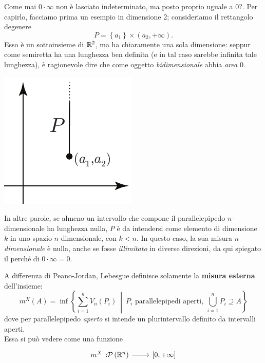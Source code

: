 	\begin{observe}
		Come mai $0\cdot \infty$ non è lasciato indeterminato, ma posto proprio uguale a 0?. Per capirlo, facciamo prima un esempio in dimensione 2; consideriamo il rettangolo degenere
		\begin{equation*}
			P=\left\{a_1\right\}\times\left(a_2,+\infty\right).
		\end{equation*}
		Esso è un sottoinsieme di $\mathbb{R}^2$, ma ha chiaramente una sola dimensione: seppur come semiretta ha una lunghezza ben definita (e in tal caso sarebbe infinita tale lunghezza), è ragionevole dire che come oggetto \textit{bidimensionale} abbia \textit{area} $0$.
		\begin{center}
			\includegraphics[trim=0cm 0cm 0cm 0cm, clip, scale=0.71]{images/rettangolodegenere.pdf}
		\end{center}
		In altre parole, se almeno un intervallo che compone il parallelepipedo $n$-dimensionale ha lunghezza nulla, $P$ è da intendersi come elemento di dimensione $k$ in uno spazio $n$-dimensionale, con $k< n$.
		In questo caso, la sua misura $n$\textit{-dimensionale} è nulla, anche se fosse \textit{illimitato} in diverse direzioni, da qui spiegato il perché di $0\cdot \infty =0$.
	\end{observe}
	A differenza di Peano-Jordan, Lebesgue definisce solamente la \textbf{misura esterna} dell'insieme:
	\begin{equation}
		m^X\left(A\right)=\inf\left\{\sum_{i=1}^{n}V_n\left(P_i\right)\ \middle| \ P_i\text{ parallelepipedi aperti},\ \bigcup_{i=1}^nP_i\supseteq A\right\}
	\end{equation}
dove per parallelepipedo \textit{aperto} si intende un plurintervallo definito da intervalli aperti.\\ 
	Essa si può vedere come una funzione
	\begin{equation}
		\funz{m^X}{\setpart{\realset^n}}{\left[0,+\infty\right]}
	\end{equation}
